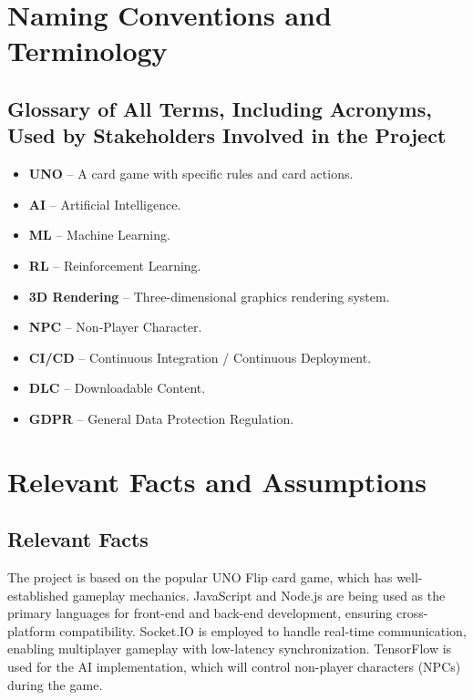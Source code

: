 \documentclass{article}
\begin{document}
\section{Naming Conventions and Terminology}

\subsection{Glossary of All Terms, Including Acronyms, Used by Stakeholders Involved in the Project}

\begin{itemize}
    \item \textbf{UNO} – A card game with specific rules and card actions.
    \item \textbf{AI} – Artificial Intelligence.
    \item \textbf{ML} – Machine Learning.
    \item \textbf{RL} – Reinforcement Learning.
    \item \textbf{3D Rendering} – Three-dimensional graphics rendering system.
    \item \textbf{NPC} – Non-Player Character.
    \item \textbf{CI/CD} – Continuous Integration / Continuous Deployment.
    \item \textbf{DLC} – Downloadable Content.
    \item \textbf{GDPR} – General Data Protection Regulation.
\end{itemize}

\section{Relevant Facts and Assumptions}

\subsection{Relevant Facts}
The project is based on the popular UNO Flip card game, which has well-established gameplay mechanics. JavaScript and Node.js are being used as the primary languages for front-end and back-end development, ensuring cross-platform compatibility. Socket.IO is employed to handle real-time communication, enabling multiplayer gameplay with low-latency synchronization. TensorFlow is used for the AI implementation, which will control non-player characters (NPCs) during the game.
\end{document}
